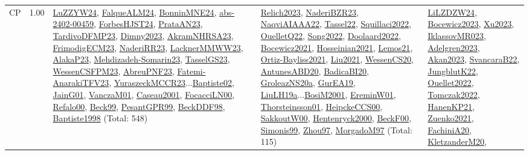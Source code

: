{\begin{longtable}{p{3cm}r>{\raggedright\arraybackslash}p{6cm}>{\raggedright\arraybackslash}p{6cm}>{\raggedright\arraybackslash}p{8cm}}
\index{CP}\index{CP!CP}CP &  1.00 & \hyperref[detail:LuZZYW24]{LuZZYW24}, \hyperref[detail:FalqueALM24]{FalqueALM24}, \hyperref[detail:BonninMNE24]{BonninMNE24}, \hyperref[detail:abs-2402-00459]{abs-2402-00459}, \hyperref[detail:ForbesHJST24]{ForbesHJST24}, \hyperref[detail:PrataAN23]{PrataAN23}, \hyperref[detail:TardivoDFMP23]{TardivoDFMP23}, \hyperref[detail:Dimny2023]{Dimny2023}, \hyperref[detail:AkramNHRSA23]{AkramNHRSA23}, \hyperref[detail:FrimodigECM23]{FrimodigECM23}, \hyperref[detail:NaderiRR23]{NaderiRR23}, \hyperref[detail:LacknerMMWW23]{LacknerMMWW23}, \hyperref[detail:AlakaP23]{AlakaP23}, \hyperref[detail:Mehdizadeh-Somarin23]{Mehdizadeh-Somarin23}, \hyperref[detail:TasselGS23]{TasselGS23}, \hyperref[detail:WessenCSFPM23]{WessenCSFPM23}, \hyperref[detail:AbreuPNF23]{AbreuPNF23}, \hyperref[detail:Fatemi-AnarakiTFV23]{Fatemi-AnarakiTFV23}, \hyperref[detail:YuraszeckMCCR23]{YuraszeckMCCR23}...\hyperref[detail:Baptiste02]{Baptiste02}, \hyperref[detail:JainG01]{JainG01}, \hyperref[detail:VanczaM01]{VanczaM01}, \hyperref[detail:Caseau2001]{Caseau2001}, \hyperref[detail:FocacciLN00]{FocacciLN00}, \hyperref[detail:Refalo00]{Refalo00}, \hyperref[detail:Beck99]{Beck99}, \hyperref[detail:PesantGPR99]{PesantGPR99}, \hyperref[detail:BeckDDF98]{BeckDDF98}, \hyperref[detail:Baptiste1998]{Baptiste1998} (Total: 548) & \hyperref[detail:Relich2023]{Relich2023}, \hyperref[detail:NaderiBZR23]{NaderiBZR23}, \hyperref[detail:NaqviAIAAA22]{NaqviAIAAA22}, \hyperref[detail:Tassel22]{Tassel22}, \hyperref[detail:Squillaci2022]{Squillaci2022}, \hyperref[detail:OuelletQ22]{OuelletQ22}, \hyperref[detail:Song2022]{Song2022}, \hyperref[detail:Doolaard2022]{Doolaard2022}, \hyperref[detail:Bocewicz2021]{Bocewicz2021}, \hyperref[detail:Hosseinian2021]{Hosseinian2021}, \hyperref[detail:Lemos21]{Lemos21}, \hyperref[detail:Ortiz-Bayliss2021]{Ortiz-Bayliss2021}, \hyperref[detail:Liu2021]{Liu2021}, \hyperref[detail:WessenCS20]{WessenCS20}, \hyperref[detail:AntunesABD20]{AntunesABD20}, \hyperref[detail:BadicaBI20]{BadicaBI20}, \hyperref[detail:GroleazNS20a]{GroleazNS20a}, \hyperref[detail:GurEA19]{GurEA19}, \hyperref[detail:LiuLH19a]{LiuLH19a}...\hyperref[detail:BosiM2001]{BosiM2001}, \hyperref[detail:EreminW01]{EreminW01}, \hyperref[detail:Thorsteinsson01]{Thorsteinsson01}, \hyperref[detail:HeipckeCCS00]{HeipckeCCS00}, \hyperref[detail:SakkoutW00]{SakkoutW00}, \hyperref[detail:Hentenryck2000]{Hentenryck2000}, \hyperref[detail:BeckF00]{BeckF00}, \hyperref[detail:Simonis99]{Simonis99}, \hyperref[detail:Zhou97]{Zhou97}, \hyperref[detail:MorgadoM97]{MorgadoM97} (Total: 115) & \hyperref[detail:LiLZDZW24]{LiLZDZW24}, \hyperref[detail:Bocewicz2023]{Bocewicz2023}, \hyperref[detail:Xu2023]{Xu2023}, \hyperref[detail:IklassovMR023]{IklassovMR023}, \hyperref[detail:Adelgren2023]{Adelgren2023}, \hyperref[detail:Akan2023]{Akan2023}, \hyperref[detail:SvancaraB22]{SvancaraB22}, \hyperref[detail:JungblutK22]{JungblutK22}, \hyperref[detail:Ouellet2022]{Ouellet2022}, \hyperref[detail:Tomczak2022]{Tomczak2022}, \hyperref[detail:HanenKP21]{HanenKP21}, \hyperref[detail:Zuenko2021]{Zuenko2021}, \hyperref[detail:FachiniA20]{FachiniA20}, \hyperref[detail:KletzanderM20]{KletzanderM20}, 
\end{longtable}}
